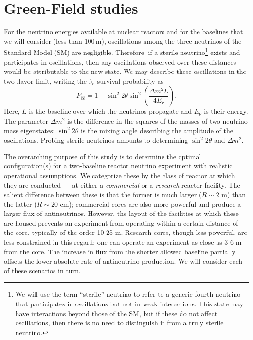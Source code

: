 \documentclass[prd, twocolumn, tightenlines, twoside, secnumarabic, superscriptaddress, preprintnumbers, nofootinbib, notitlepage]{revtex4-1}
\begin{document}
\section{Green-Field studies}
\label{sec:gf}
\setcounter{equation}{0}

For the neutrino energies available at nuclear reactors and for the baselines that we will consider (less than 100\,m), oscillations among the three neutrinos of the Standard Model (SM) are negligible. Therefore, if a sterile neutrino\footnote{We will use the term ``sterile'' neutrino to refer to a generic fourth neutrino that participates in oscillations but not in weak interactions. This state may have interactions beyond those of the SM, but if these do not affect oscillations, then there is no need to distinguish it from a truly sterile neutrino.} exists and participates in oscillations, then any oscillations observed over these distances would be attributable to the new state. We may describe these oscillations in the two-flavor limit, writing the $\overline\nu_e$ survival probability as
\begin{equation}
    P_{\overline e \overline e} = 1 - \sin^2 2\theta \sin^2 \left( \frac{\Delta m^2 L}{4 E_\nu} \right).
    \label{eq:prob}
\end{equation}
Here, $L$ is the baseline over which the neutrinos propagate and $E_\nu$ is their energy. The parameter $\Delta m^2$ is the difference in the squares of the masses of two neutrino mass eigenstates; $\sin^2 2\theta$ is the mixing angle describing the amplitude of the oscillations. Probing sterile neutrinos amounts to determining $\sin^2 2\theta$ and $\Delta m^2$.

The overarching purpose of this study is to determine the optimal configuration(s) for a two-baseline reactor neutrino experiment with realistic operational assumptions. We categorize these by the class of reactor at which they are conducted --- at either a \emph{commercial} or a \emph{research} reactor facility. The salient difference between these is that the former is much larger ($R\sim2$ m) than the latter ($R\sim20$ cm); commercial cores are also more powerful and produce a larger flux of antineutrinos. However, the layout of the facilities at which these are housed prevents an experiment from operating within a certain distance of the core, typically of the order 10-25 m. Research cores, though less powerful, are less constrained in this regard: one can operate an experiment as close as 3-6 m from the core. The increase in flux from the shorter allowed baseline partially offsets the lower absolute rate of antineutrino production. We will consider each of these scenarios in turn.
\end{document}
